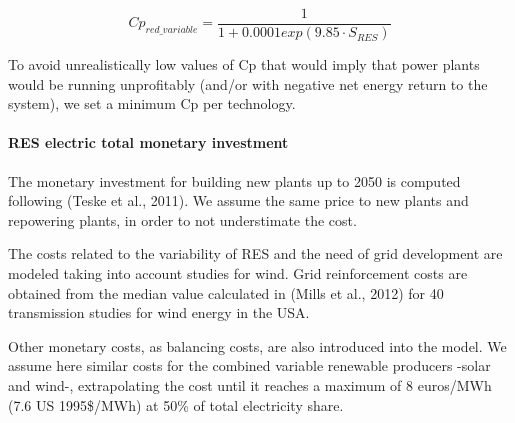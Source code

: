 \begin{equation}
    Cp_{red\_variable}= \frac {1} {1+0.0001exp(9.85 \cdot S_{RES})}
    \label{eq:cp-reduction-variable}
\end{equation}

To avoid unrealistically low values of Cp that would imply that power plants would be running
unprofitably (and/or with negative net energy return to the system), we set a minimum Cp per
technology.

\paragraph{RES electric total monetary investment}

The monetary investment for building new plants up to 2050 is computed following (Teske et al.,
2011). We assume the same price to new plants and repowering plants, in order to not understimate the cost. 

The costs related to the variability of RES and the need of grid development are modeled taking into account studies for wind. Grid reinforcement costs are obtained from the median value calculated in (Mills et al., 2012)  for 40 transmission studies for wind energy
in the USA.

Other monetary costs, as balancing costs, are also introduced into the model. We assume here similar costs for the combined variable
renewable producers -solar and wind-, extrapolating the cost until it reaches a maximum of 8
euros/MWh (7.6 US 1995\$/MWh) at 50\% of total electricity share.

